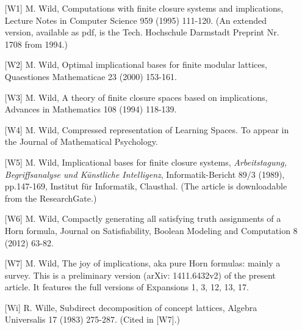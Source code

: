\documentclass[11pt]{article}
\begin{document}
\begin{enumerate}
	\item[{[W1]}] M. Wild, Computations with finite closure systems and implications, Lecture Notes in Computer Science 959 (1995) 111-120. (An extended version, available as pdf, is the Tech. Hochschule Darmstadt Preprint Nr. 1708 from 1994.)
	\item[{[W2]}] M. Wild, Optimal implicational bases for finite modular lattices, Quaestiones Mathematicae 23 (2000) 153-161.
	\item[{[W3]}] M. Wild, A theory of finite closure spaces based on implications, Advances in Mathematics 108 (1994) 118-139.
\item[{[W4]}] M. Wild, Compressed representation of Learning Spaces. To appear in the Journal of Mathematical Psychology.
\item[{[W5]}] M. Wild, Implicational bases for finite closure systems, {\it Arbeitstagung, Begriffsanalyse und K\"{u}nstliche Intelligenz}, Informatik-Bericht 89/3 (1989), pp.147-169, Institut f\"{u}r Informatik, Clausthal. (The article is downloadable from the ResearchGate.)
\item[{[W6]}] M. Wild, Compactly generating all satisfying truth assignments of a Horn formula, Journal on Satisfiability, Boolean Modeling and Computation 8 (2012) 63-82.
\item[{[W7]}] M. Wild, The joy of implications, aka pure Horn formulas: mainly a survey. This is a preliminary version (arXiv: 1411.6432v2) of the present article. It features the full versions of Expansions 1, 3, 12, 13, 17.
\item[{[Wi]}] R. Wille, Subdirect decomposition of concept lattices, Algebra Universalis 17 (1983) 275-287. (Cited in [W7].)
\end{enumerate}
\end{document}
